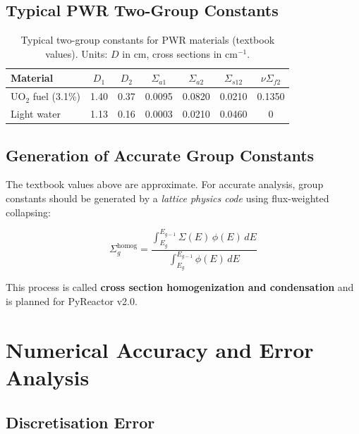 \documentclass[12pt,a4paper]{article}
\begin{document}
\subsection{Typical PWR Two-Group Constants}

\begin{table}[h!]
\centering
\begin{tabular}{lcccccc}
\toprule
\textbf{Material} & $D_1$ & $D_2$ & $\Sigma_{a1}$ & $\Sigma_{a2}$
                  & $\Sigma_{s12}$ & $\nu\Sigma_{f2}$ \\
\midrule
UO$_2$ fuel (3.1\%) & 1.40 & 0.37 & 0.0095 & 0.0820 & 0.0210 & 0.1350 \\
Light water         & 1.13 & 0.16 & 0.0003 & 0.0210 & 0.0460 & 0 \\
\bottomrule
\end{tabular}
\caption{Typical two-group constants for PWR materials (textbook values).
         Units: $D$ in cm, cross sections in cm$^{-1}$.}
\end{table}

\subsection{Generation of Accurate Group Constants}

The textbook values above are approximate. For accurate analysis,
group constants should be generated by a \textit{lattice physics code}
using flux-weighted collapsing:

\begin{equation}
  \Sigma_{g}^{\text{homog}} =
  \frac{\displaystyle\int_{E_g}^{E_{g-1}} \Sigma(E)\,\phi(E)\,dE}
       {\displaystyle\int_{E_g}^{E_{g-1}} \phi(E)\,dE}
\end{equation}

This process is called \textbf{cross section homogenization and condensation}
and is planned for PyReactor v2.0.

\section{Numerical Accuracy and Error Analysis}

\subsection{Discretisation Error}
\end{document}
